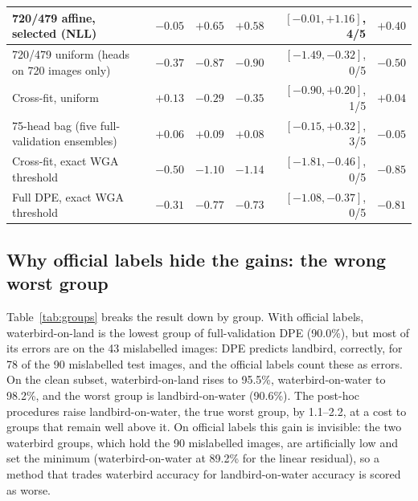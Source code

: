 \begin{table}[t]
{\begin{tabular}{@{}lrrrrr@{}}
720/479 affine, selected (NLL) & $-0.05$ & $+0.65$ & $+0.58$ & $[-0.01,+1.16]$, 4/5 & $+0.40$\\\midrule
720/479 uniform (heads on 720 images only) & $-0.37$ & $-0.87$ & $-0.90$ & $[-1.49,-0.32]$, 0/5 & $-0.50$\\
Cross-fit, uniform & $+0.13$ & $-0.29$ & $-0.35$ & $[-0.90,+0.20]$, 1/5 & $+0.04$\\
75-head bag (five full-validation ensembles) & $+0.06$ & $+0.09$ & $+0.08$ & $[-0.15,+0.32]$, 3/5 & $-0.05$\\
Cross-fit, exact WGA threshold & $-0.50$ & $-1.10$ & $-1.14$ & $[-1.81,-0.46]$, 0/5 & $-0.85$\\
Full DPE, exact WGA threshold & $-0.31$ & $-0.77$ & $-0.73$ & $[-1.08,-0.37]$, 0/5 & $-0.81$\\
\bottomrule
\end{tabular}}
\end{table}

\subsection{Why official labels hide the gains: the wrong worst group}
Table~\ref{tab:groups} breaks the result down by group. With official labels, waterbird-on-land is the lowest group of full-validation DPE (90.0\%), but most of its errors are on the 43 mislabelled images: DPE predicts landbird, correctly, for 78 of the 90 mislabelled test images, and the official labels count these as errors. On the clean subset, waterbird-on-land rises to 95.5\%, waterbird-on-water to 98.2\%, and the worst group is landbird-on-water (90.6\%). The post-hoc procedures raise landbird-on-water, the true worst group, by 1.1--2.2\pp{}, at a cost to groups that remain well above it. On official labels this gain is invisible: the two waterbird groups, which hold the 90 mislabelled images, are artificially low and set the minimum (waterbird-on-water at 89.2\% for the linear residual), so a method that trades waterbird accuracy for landbird-on-water accuracy is scored as worse.

